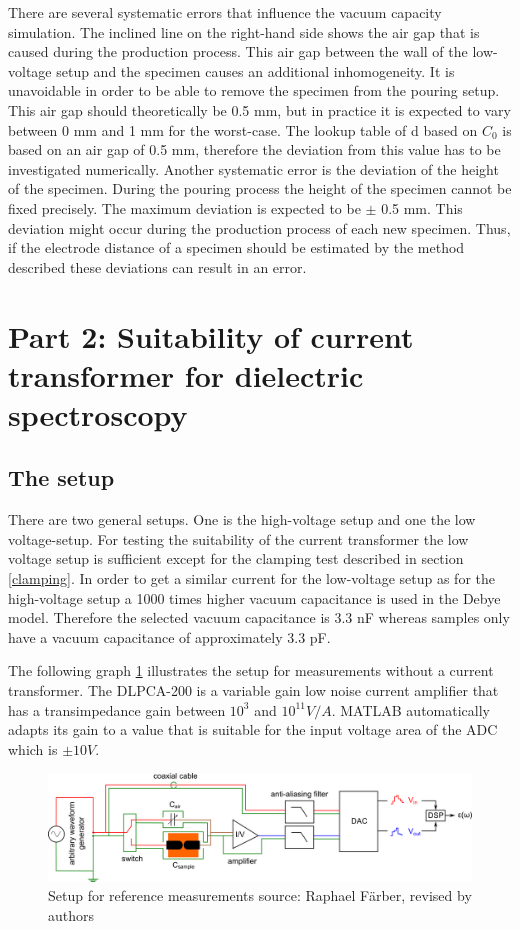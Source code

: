  There are several systematic errors that influence the vacuum capacity simulation. The inclined line on the right-hand side shows the air gap that is caused during the production process. This air gap between the wall of the low-voltage setup and the specimen causes an additional inhomogeneity. It is unavoidable in order to be able to remove the specimen from the pouring setup. This air gap should theoretically be 0.5 mm, but in practice it is expected to vary between 0 mm and 1 mm for the worst-case. The lookup table of d based on $C_0$ is based on an air gap of 0.5 mm, therefore the deviation from this value has to be investigated numerically.
Another systematic error is the deviation of the height of the specimen. During  the pouring process the height of the specimen cannot be fixed precisely. The maximum deviation is expected to be $\pm$ 0.5 mm. This deviation might occur during the production process of each new specimen. Thus, if the electrode distance of a specimen should be estimated by the method described these deviations can result in an error. 
 
\section{Part 2:  Suitability of current transformer for dielectric spectroscopy}
\subsection{The setup}
There are two general setups. One is the high-voltage setup and one the low voltage-setup. For testing the suitability of the current transformer the low voltage setup is sufficient except for the clamping test described in section \ref{clamping}. In order to get a similar current for the low-voltage setup as for the high-voltage setup a 1000 times higher vacuum capacitance is used in the Debye model. Therefore the selected vacuum capacitance is 3.3 nF whereas samples only have a vacuum capacitance of approximately 3.3 pF.  

The following graph \ref{sec.setup_amplifier} illustrates the setup for measurements without a current transformer. The DLPCA-200 is a variable gain low noise current amplifier that has a transimpedance gain between $10^3$ and $10^{11} V/A$. MATLAB automatically adapts its gain to a value that is suitable for the input voltage area of the ADC which is $\pm 10V$. 

\begin{figure}[htbp]
	\centering
	\includegraphics[width=\textwidth]{figures/Method/setup/setup_amplifier}		
	\caption[Kurze Abbildungsbeschreibung]{Setup for reference measurements {source: Raphael F\"arber, revised by authors}} 
	\label{sec.setup_amplifier}

\end{figure}

